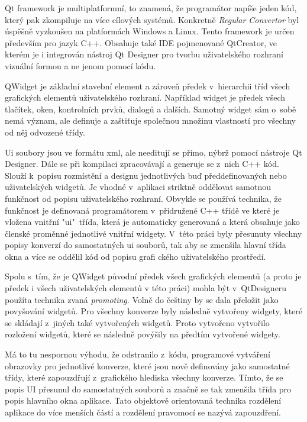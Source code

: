 
Qt framework je multiplatformní, to znamená, že programátor napíše jeden kód, který pak zkompiluje na více cílových systémů. Konkretně \textit{Regular Convertor} byl úspěšně vyzkoušen na platformách Windows a Linux. Tento framework je určen především pro jazyk C++. Obsahuje také IDE pojmenované QtCreator, ve kterém je i integrován nástroj Qt Designer pro tvorbu uživatelského rozhraní vizuální formou a ne jenom pomocí kódu. \cite{QT} 


QWidget je základní stavební element a zároveň předek v~hierarchii tříd všech grafických elementů uživatelského rozhraní. Například widget je předek všech tlačítek, oken, kontrolních prvků, dialogů a dalších. Samotný widget sám o~sobě nemá význam, ale definuje a zaštiťuje společnou množinu vlastností pro všechny od něj odvozené třídy.


Ui soubory jsou ve formátu xml, ale needitují se přímo, nýbrž pomocí nástroje Qt Designer. Dále se při kompilaci zpracovávají a generuje se z~nich C++ kód. Slouží k~popisu rozmístění a designu jednotlivých buď předdefinovaných nebo uživatelských widgetů. Je vhodné v~aplikaci striktně oddělovat samotnou funkčnost od popisu uživatelského rozhraní. Obvykle se používá technika, že funkčnost je definovaná programátorem v~přidružené C++ třídě ve které je vložena vnitřní "ui"\ třída, která je automaticky generovaná a která obsahuje jako členské proměnné jednotlivé vnitřní widgety. V~této práci byly přesunuty všechny popisy konverzí do samostatných ui souborů, tak aby se zmenšila hlavní třída okna a více se oddělil kód od popisu grafi ckého uživatelského prostředí. 


Spolu s~tím, že je QWidget původní předek všech grafických elementů (a proto je předek i všech uživatelských elementů v této práci) mohla být v~QtDesigneru použíta technika zvaná \textit{promoting}. Volně do češtiny by se dala přeložit jako povyšování widgetů. Pro všechny konverze byly následně vytvořeny widgety, které se skládají z~jiných také vytvořených widgetů. Proto vytvořeno vytvořilo rozložení widgetů, které se následně povýšily na předtím vytvořené widgety.

Má to tu nespornou výhodu, že odstranilo z~kódu, programové vytváření obrazovky pro jednotlivé konverze, které jsou nově definovány jako samostatné třídy, které zapouzdřují z~grafického hlediska všechny konverze. Tímto, že se popis UI přesunul do samostatných souborů a značně se tak zmenšila třída pro popis hlavního okna aplikace. Tato objektově orientovaná technika rozdělení aplikace do více menších částí a rozdělení pravomocí se nazývá zapouzdření.


